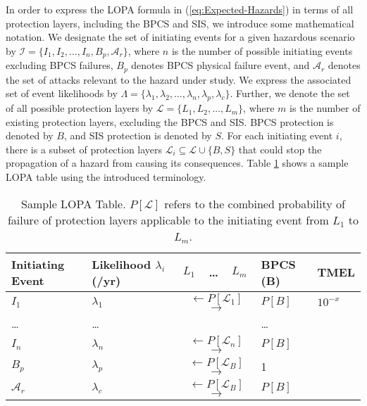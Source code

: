 \documentclass[journal]{IEEEtran}
\begin{document}
In order to express the LOPA formula in (\ref{eq:Expected-Hazards}) in terms of all protection layers, including the BPCS and SIS, we introduce some mathematical notation. We designate the set of initiating events for a given hazardous scenario by $\mathcal{I}=\{I_1, I_2, \ldots, I_n,B_p,\mathcal{A}_r \}$, where $n$ is the number of possible initiating events excluding BPCS failures, $B_p$ denotes BPCS physical failure event, and $\mathcal{A}_r$ denotes the set of attacks relevant to the hazard under study. We express the associated set of event likelihoods by $\Lambda = \{ \lambda_1, \lambda_2,\ldots,\lambda_n, \lambda_p, \lambda_c \}$. Further, we denote the set of all possible protection layers by $\mathcal{L}=\{ L_1, L_2, \ldots, L_m \}$, where $m$ is the number of existing protection layers, excluding the BPCS and SIS. BPCS protection is denoted by $B$, and SIS protection is denoted by $S$. For each initiating event $i$, there is a subset of protection layers $\mathcal{L}_i \subseteq \mathcal{L} \cup \{B,S\}$ that could stop the propagation of a hazard from causing its consequences. Table \ref{tab:LOPA-TABLE-SAMPLE} shows a sample LOPA table using the introduced terminology.

\begin{table}[]
\centering
\begin{tabular}{p{1.5cm} p{1.5cm} p{0.3cm} p{0.3cm} p{0.3cm} p{1cm} p{0.5cm}}
	\hline\hline
	Initiating Event			& Likelihood $\lambda_i$ (/yr)	& $L_1$ & \ldots & $L_m$ & BPCS (B)	& TMEL  \\ \hline\hline
	$I_1$			& $\lambda_1$ 	& \multicolumn{3}{c}{$ \leftarrow P[\mathcal{L}_1]$ $\rightarrow$} & $P[B]$ & $10^{-x}$ \\ %
	\ldots	& \ldots			&  &  & & \ldots &  \\ %
	$I_n$	& $\lambda_n$		& \multicolumn{3}{c}{$ \leftarrow P[\mathcal{L}_n]$ $\rightarrow$}& $P[B]$ &  \\ %
	$B_p$				& $\lambda_p$			& \multicolumn{3}{c}{$ \leftarrow P[\mathcal{L}_B]$ $\rightarrow$} & 1 & \\ %
	$\mathcal{A}_r$				& $\lambda_c$		& \multicolumn{3}{c}{$ \leftarrow P[\mathcal{L}_B]$ $\rightarrow$}& $P[B]$ & \\ \hline
\end{tabular}
\caption{Sample LOPA Table. $P[\mathcal{L}]$ refers to the combined probability of failure of protection layers applicable to the initiating event from $L_1$ to $L_m$.}
\label{tab:LOPA-TABLE-SAMPLE}
\end{table}
\end{document}
